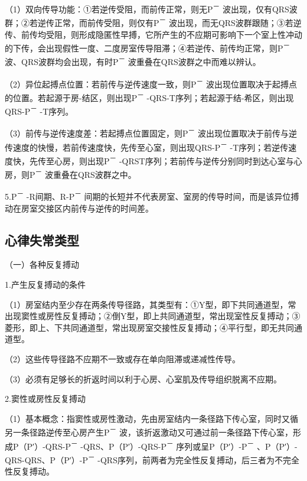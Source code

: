 （1）双向传导功能：①若逆传受阻，而前传正常，则无P\textsuperscript{－}
波出现，仅有QRS波群；②若逆传正常，而前传受阻，则仅有P\textsuperscript{－}
波出现，而无QRS波群跟随；③若逆传、前传均受阻，则形成隐匿性早搏，它所产生的不应期可影响下一个室上性冲动的下传，会出现假性一度、二度房室传导阻滞；④若逆传、前传均正常，则P\textsuperscript{－}
波、QRS波群均会出现，有时P\textsuperscript{－}
波重叠在QRS波群之中而难以辨认。

（2）异位起搏点位置：若前传与逆传速度一致，则P\textsuperscript{－}
波出现位置取决于起搏点的位置。若起源于房-结区，则出现P\textsuperscript{－}
-QRS-T序列；若起源于结-希区，则出现QRS-P\textsuperscript{－} -T序列。

（3）前传与逆传速度差：若起搏点位置固定，则P\textsuperscript{－}
波出现位置取决于前传与逆传速度的快慢，若前传速度快，先传至心室，则出现QRS-P\textsuperscript{－}
-T序列；若逆传速度快，先传至心房，则出现P\textsuperscript{－}
-QRST序列；若前传与逆传分别同时到达心室与心房，则P\textsuperscript{－}
波重叠在QRS波群之中。

5.P\textsuperscript{－} -R间期、R-P\textsuperscript{－}
间期的长短并不代表房室、室房的传导时间，而是该异位搏动在房室交接区内前传与逆传的时间差。

\protect\hypertarget{text00021.htmlux5cux23subid239}{}{}

\subsection{心律失常类型}

（一）各种反复搏动

1.产生反复搏动的条件

（1）房室结内至少存在两条传导径路，其类型有：①Y型，即下共同通道型，常出现窦性或房性反复搏动；②倒Y型，即上共同通道型，常出现室性反复搏动；③菱形，即上、下共同通道型，常出现房室交接性反复搏动；④平行型，即无共同通道型。

（2）这些传导径路不应期不一致或存在单向阻滞或递减性传导。

（3）必须有足够长的折返时间以利于心房、心室肌及传导组织脱离不应期。

2.窦性或房性反复搏动

（1）基本概念：指窦性或房性激动，先由房室结内一条径路下传心室，同时又循另一条径路逆传至心房产生P\textsuperscript{－}
波，该折返激动又可通过前一条径路下传心室，形成P（P′）-QRS-P\textsuperscript{－}
-QRS、P（P′）-QRS-P\textsuperscript{－}
序列或呈P（P′）-P\textsuperscript{－}
、P（P′）-QRS-QRS、P（P′）-P\textsuperscript{－}
-QRS序列，前两者为完全性反复搏动，后三者为不完全性反复搏动。

